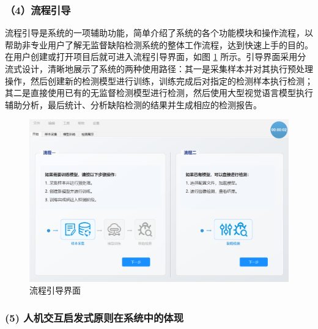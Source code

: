 \documentclass[
  ]{njuthesis}
\begin{document}
\subsubsection{（4）流程引导}

流程引导是系统的一项辅助功能，简单介绍了系统的各个功能模块和操作流程，以帮助非专业用户了解无监督缺陷检测系统的整体工作流程，达到快速上手的目的。在用户创建或打开项目后就可进入流程引导界面，如图 \ref{流程引导界面} 所示。引导界面采用分流式设计，清晰地展示了系统的两种使用路径：其一是采集样本并对其执行预处理操作，然后创建新的检测模型进行训练，训练完成后对指定的检测样本执行检测；其二是直接使用已有的无监督检测模型进行检测，然后使用大型视觉语言模型执行辅助分析，最后统计、分析缺陷检测的结果并生成相应的检测报告。

\begin{figure}[H]
    \centering
    \includegraphics[width=\textwidth]{images/流程引导界面.png}
    \caption{流程引导界面}
    \label{流程引导界面}
\end{figure}

\subsubsection{(5) 人机交互启发式原则在系统中的体现}
\end{document}
